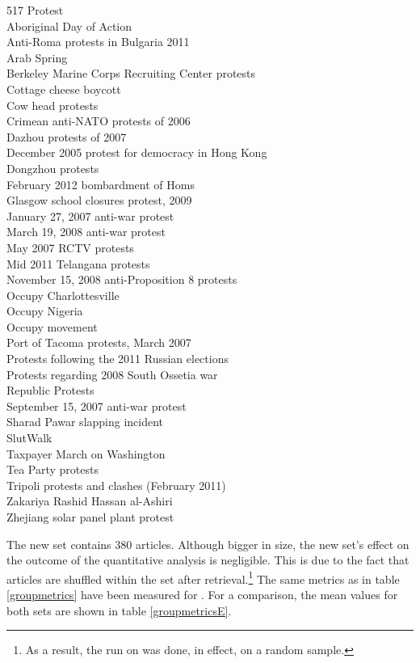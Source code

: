 \begin{multicols}{3}
517 Protest\\
Aboriginal Day of Action\\
Anti-Roma protests in Bulgaria 2011\\
Arab Spring\\
Berkeley Marine Corps Recruiting Center protests\\
Cottage cheese boycott\\
Cow head protests\\
Crimean anti-NATO protests of 2006\\
Dazhou protests of 2007\\
December 2005 protest for democracy in Hong Kong\\
Dongzhou protests\\
February 2012 bombardment of Homs\\
Glasgow school closures protest, 2009\\
January 27, 2007 anti-war protest\\
March 19, 2008 anti-war protest\\
May 2007 RCTV protests\\
Mid 2011 Telangana protests\\
November 15, 2008 anti-Proposition 8 protests\\
Occupy Charlottesville\\
Occupy Nigeria\\
Occupy movement\\
Port of Tacoma protests, March 2007\\
Protests following the 2011 Russian elections\\
Protests regarding 2008 South Ossetia war\\
Republic Protests\\
September 15, 2007 anti-war protest\\
Sharad Pawar slapping incident\\
SlutWalk\\
Taxpayer March on Washington\\
Tea Party protests\\
Tripoli protests and clashes (February 2011)\\
Zakariya Rashid Hassan al-Ashiri\\
Zhejiang solar panel plant protest
\end{multicols}

The new set  contains 380 articles.
Although bigger in size, the new set's effect on the outcome of the quantitative analysis is negligible.
This is due to the fact that articles are shuffled within the set after retrieval.\footnote{As a result, the run on  was done, in effect,  on a random sample.}
The same metrics as in table \ref{groupmetrics} have been measured for .
For a comparison, the mean values for both sets are shown in table \ref{groupmetricsE}.


